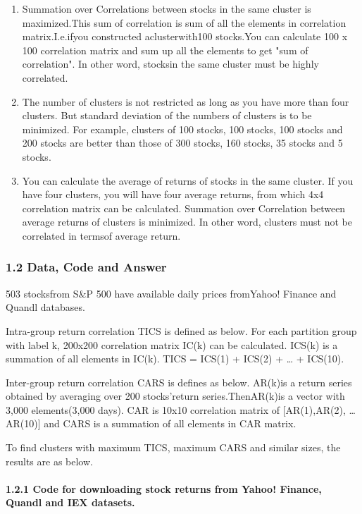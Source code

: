 \documentclass[11pt]{article}
\begin{document}
\begin{enumerate}
\def\labelenumi{\alph{enumi}.}
\item
  Summation over Correlations between stocks in the same cluster is
  maximized.This sum of correlation is sum of all the elements in
  correlation matrix.I.e.ifyou constructed aclusterwith100 stocks.You
  can calculate 100 x 100 correlation matrix and sum up all the elements
  to get "sum of correlation". In other word, stocksin the same cluster
  must be highly correlated.
\item
  The number of clusters is not restricted as long as you have more than
  four clusters. But standard deviation of the numbers of clusters is to
  be minimized. For example, clusters of 100 stocks, 100 stocks, 100
  stocks and 200 stocks are better than those of 300 stocks, 160 stocks,
  35 stocks and 5 stocks.
\item
  You can calculate the average of returns of stocks in the same
  cluster. If you have four clusters, you will have four average
  returns, from which 4x4 correlation matrix can be calculated.
  Summation over Correlation between average returns of clusters is
  minimized. In other word, clusters must not be correlated in termsof
  average return.
\end{enumerate}

    \subsubsection{1.2 Data, Code and Answer}\label{data-code-and-answer}

    503 stocksfrom S\&P 500 have available daily prices fromYahoo! Finance
and Quandl databases.

Intra-group return correlation TICS is defined as below. For each
partition group with label k, 200x200 correlation matrix IC(k) can be
calculated. ICS(k) is a summation of all elements in IC(k). TICS =
ICS(1) + ICS(2) + \ldots{} + ICS(10).

Inter-group return correlation CARS is defines as below. AR(k)is a
return series obtained by averaging over 200 stocks'return
series.ThenAR(k)is a vector with 3,000 elements(3,000 days). CAR is
10x10 correlation matrix of {[}AR(1),AR(2), \ldots{}AR(10){]} and CARS
is a summation of all elements in CAR matrix.

To find clusters with maximum TICS, maximum CARS and similar sizes, the
results are as below.

    \paragraph{1.2.1 Code for downloading stock returns from Yahoo! Finance,
Quandl and IEX
datasets.}\label{code-for-downloading-stock-returns-from-yahoo-finance-quandl-and-iex-datasets.}
\end{document}
